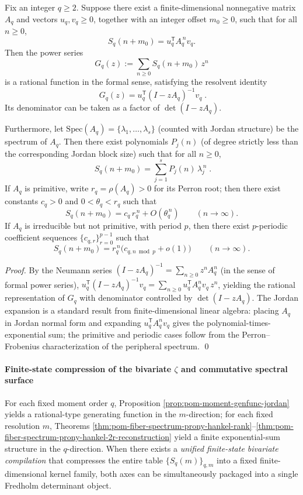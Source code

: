 \begin{proposition}\label{prop:pom-moment-genfunc-jordan}
Fix an integer \(q\ge 2\).
Suppose there exist a finite-dimensional nonnegative matrix \(A_q\) and vectors \(u_q,v_q\ge 0\), together with an integer offset \(m_0\ge 0\), such that for all \(n\ge 0\),
\[
S_q(n+m_0)=u_q^{\mathsf T}A_q^{\,n}v_q.
\]
Then the power series
\[
G_q(z):=\sum_{n\ge 0} S_q(n+m_0)\,z^n
\]
is a rational function in the formal sense, satisfying the resolvent identity
\[
\boxed{\;
G_q(z)=u_q^{\mathsf T}(I-zA_q)^{-1}v_q\; }.
\]
Its denominator can be taken as a factor of \(\det(I-zA_q)\).
\par
Furthermore, let \(\mathrm{Spec}(A_q)=\{\lambda_1,\dots,\lambda_s\}\) (counted with Jordan structure) be the spectrum of \(A_q\).
Then there exist polynomials \(P_j(n)\) (of degree strictly less than the corresponding Jordan block size) such that for all \(n\ge 0\),
\[
\boxed{\;
S_q(n+m_0)=\sum_{j=1}^{s} P_j(n)\,\lambda_j^{\,n}\; }.
\]
If \(A_q\) is primitive, write \(r_q=\rho(A_q)>0\) for its Perron root; then there exist constants \(c_q>0\) and \(0<\theta_q<r_q\) such that
\[
S_q(n+m_0)=c_q\,r_q^{\,n}+O(\theta_q^{\,n})\qquad(n\to\infty).
\]
If \(A_q\) is irreducible but not primitive, with period \(p\), then there exist \(p\)-periodic coefficient sequences \(\{c_{q,r}\}_{r=0}^{p-1}\) such that
\[
S_q(n+m_0)=r_q^{\,n}\bigl(c_{q,n\bmod p}+o(1)\bigr)\qquad(n\to\infty).
\]
\end{proposition}
\begin{proof}
By the Neumann series \((I-zA_q)^{-1}=\sum_{n\ge 0} z^nA_q^n\) (in the sense of formal power series),
\(
u_q^{\mathsf T}(I-zA_q)^{-1}v_q=\sum_{n\ge 0}u_q^{\mathsf T}A_q^n v_q\,z^n
\), yielding the rational representation of \(G_q\) with denominator controlled by \(\det(I-zA_q)\).
The Jordan expansion is a standard result from finite-dimensional linear algebra: placing \(A_q\) in Jordan normal form and expanding \(u_q^{\mathsf T}A_q^{n}v_q\) gives the polynomial-times-exponential sum;
the primitive and periodic cases follow from the Perron--Frobenius characterization of the peripheral spectrum. \qed
\end{proof}

\paragraph{Finite-state compression of the bivariate \texorpdfstring{$\zeta$}{zeta} and commutative spectral surface}
For each fixed moment order \(q\), Proposition \ref{prop:pom-moment-genfunc-jordan} yields a rational-type generating function in the \(m\)-direction;
for each fixed resolution \(m\), Theorems \ref{thm:pom-fiber-spectrum-prony-hankel-rank}--\ref{thm:pom-fiber-spectrum-prony-hankel-2r-reconstruction} yield a finite exponential-sum structure in the \(q\)-direction.
When there exists a \emph{unified finite-state bivariate compilation} that compresses the entire table \(\{S_q(m)\}_{q,m}\) into a fixed finite-dimensional kernel family, both axes can be simultaneously packaged into a single Fredholm determinant object.

